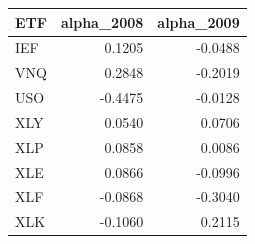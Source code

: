 \begin{tabular}{lrr}
\toprule
ETF & alpha\_2008 & alpha\_2009 \\
\midrule
IEF & 0.1205 & -0.0488 \\
VNQ & 0.2848 & -0.2019 \\
USO & -0.4475 & -0.0128 \\
XLY & 0.0540 & 0.0706 \\
XLP & 0.0858 & 0.0086 \\
XLE & 0.0866 & -0.0996 \\
XLF & -0.0868 & -0.3040 \\
XLK & -0.1060 & 0.2115 \\
\bottomrule
\end{tabular}

